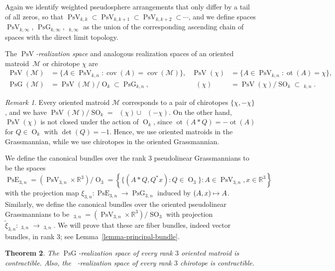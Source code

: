 \documentclass[JEP,XML,SOM,Unicode,NoFloatCountersInSection,published]{cedram}
\newcommand\mto{\mathchoice{\longmapsto}{\mapsto}{\mapsto}{\mapsto}}
\newtheorem{theorem}{Theorem}[subsection]
\theoremstyle{remark}
\newtheorem{remark}[theorem]{Remark}
\let\mc\mathcal
\let\mb\mathbb
\let\df\emph
\DeclareMathOperator{\pg}{PsG}
\DeclareMathOperator{\pog}{Ps\widetilde G}
\DeclareMathOperator{\pe}{PsE}
\DeclareMathOperator{\poe}{Ps\widetilde{E}}
\DeclareMathOperator{\orth}{O}
\DeclareMathOperator{\sorth}{SO}
\DeclareMathOperator{\pstief}{PsV}
\DeclareMathOperator{\cov}{cov}
\DeclareMathOperator{\ot}{ot}
\begin{document}
Again we identify weighted pseudosphere arrangements that only differ by a tail of all zeros, so that $\pstief_{k,k} \subset \pstief_{k,k+1} \subset \pstief_{k,k+2} \subset \cdots$, and we define spaces $\pstief_{k,\infty}$, $\pg_{k,\infty}$, $\pog_{k,\infty}$ as the union of the corresponding ascending chain of spaces with the direct limit topology.

The $\pstief$\df{-realization space} and analogous realization spaces of an oriented matroid~$\mc{M}$ or chirotope $\chi$ are
\begin{align*}
\pstief(\mc{M}) &=\{ A \in \pstief_{k,n}:\cov (A) = \cov(\mc{M})\}, &
\pstief(\chi) &=\{ A \in \pstief_{k,n}:\ot (A) = \chi\}, \\
\pg(\mc{M}) &= \pstief(\mc{M})/\orth_k \subset \pg_{k,n}, &
\pog(\chi) &= \pstief(\chi)/\sorth_k \subset \pog_{k,n}.
\end{align*}

\begin{remark}
Every oriented matroid $\mc{M}$ corresponds to a pair of chirotopes $\{\chi,-\chi\}$, and we have $\pstief(\mc{M})/\sorth_k = \pog(\chi) \cup \pog(-\chi)$.
On the other hand, $\pstief(\chi)$ is not closed under the action of $\orth_k$, since $\ot(A*Q) = -\ot(A)$ for $Q \in \orth_k$ with $\det(Q) = -1$.
Hence, we use oriented matroids in the Grassmannian, while we use chirotopes in the oriented Grassmannian.
\end{remark}

We define the canonical bundles over the rank $3$ pseudolinear Grassmannians to be the spaces
\[ \pe_{3,n} = (\pstief_{3,n} \times \mb{R}^3)/{\orth_3} = \left\{ \{(A*Q, Q^* x) : Q \in \orth_3 \} : A \in \pstief_{3,n}, x \in \mb{R}^3 \right\} \]
with the projection map $ \xi_{3,n}: \pe_{3,n} \to \pg_{3,n} $ induced by $(A,x) \mto A$.
Similarly, we define the canonical bundles over the oriented pseudolinear Grassmannians to be
$\poe_{3,n} = (\pstief_{3,n} \times \mb{R}^3)/{\sorth_3}$ with projection $ \widetilde\xi_{3,n}: \poe_{3,n} \to \pog_{3,n} $.
We will prove that these are fiber bundles, indeed vector bundles, in rank 3; see Lemma~\ref{lemma-principal-bundle}.

\label{subsection-main-theorems}

\begin{theorem}\label{theorem-pseudoreal-contract}
The $\pg$-realization space of every rank $3$ oriented matroid is contractible.
Also, the $\pog$-realization space of every rank $3$ chirotope is contractible.
\end{theorem}
\end{document}
